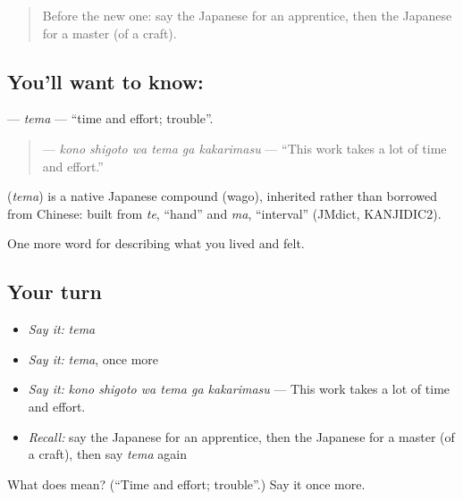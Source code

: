 \begin{quote}
Before the new one: say the Japanese for an apprentice, then the Japanese for a master (of a craft).
\end{quote}

\subsection*{You'll want to know: }
\textbf{} — \emph{tema} — \textquotedblleft{}time and effort; trouble\textquotedblright{}.

\begin{quote}
\textbf{   } — \emph{kono shigoto wa tema ga kakarimasu} — \textquotedblleft{}This work takes a lot of time and effort.\textquotedblright{}
\end{quote}

\begin{cousinweb}
\textbf{} (\emph{tema}) is a native Japanese compound (wago), inherited rather than borrowed from Chinese: built from \emph{te}, \textquotedblleft{}hand\textquotedblright{} and \emph{ma}, \textquotedblleft{}interval\textquotedblright{} (JMdict, KANJIDIC2).
\end{cousinweb}

\begin{grammarlens}[title={What you've built}]
One more word for describing what you lived and felt.
\end{grammarlens}

\subsection*{Your turn}
\begin{itemize}
\raggedright
  \item \emph{Say it:} \emph{tema}
  \item \emph{Say it:} \emph{tema}, once more
  \item \emph{Say it:} \emph{kono shigoto wa tema ga kakarimasu} — This work takes a lot of time and effort.
  \item \emph{Recall:} say the Japanese for an apprentice, then the Japanese for a master (of a craft), then say \emph{tema} again
\end{itemize}

\begin{tcolorbox}[breakable,colback=teal!4,colframe=teal!35!black,title={Before you move on}]
What does  mean? (\textquotedblleft{}Time and effort; trouble\textquotedblright{}.) Say it once more.
\end{tcolorbox}
